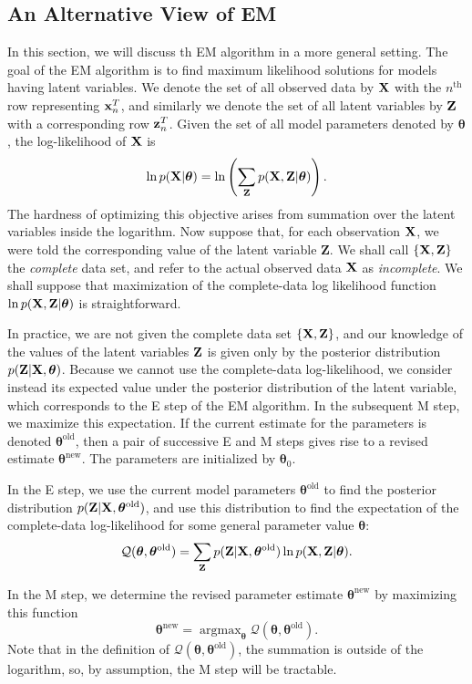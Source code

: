 \documentclass[../main.tex]{subfiles}
\begin{document}
\subsection{An Alternative View of EM}\label{sec_4_em_km_compare}
In this section, we will discuss th EM algorithm in a more general setting. The goal of the EM algorithm is to find maximum likelihood solutions for models having latent variables. We denote the set of all observed data by ${\bf X}$ with the $n^{\text{th}}$ row representing ${\bf x}_n^T$, and similarly we denote the set of all latent variables by ${\bf Z}$ with a corresponding row ${\bf z}_n^T$. Given the set of all model parameters denoted by $\bm{\theta}$, the log-likelihood of ${\bf X}$ is
\begin{equation*}
\ln p({\bf X}|\bm{\theta}) = \ln \left(\sum_{\bf Z} p({\bf X,Z}|\bm{\theta}) \right).
\end{equation*}
The hardness of optimizing this objective arises from summation over the latent variables inside the logarithm. Now suppose that, for each observation ${\bf X}$, we were told the corresponding value of the latent variable {\bf Z}. We shall call $\{{\bf X, Z}\}$ the \emph{complete} data set, and refer to the actual observed data ${\bf X}$ as \emph{incomplete}. We shall suppose that maximization of the complete-data log likelihood function $\ln p({\bf X,Z}|\bm{\theta})$ is straightforward.
\par In practice, we are not given the complete data set $\{{\bf X, Z}\}$, and our knowledge of the values of the latent variables ${\bf Z}$ is given only by the posterior distribution $p({\bf Z}|{\bf X},\bm{\theta})$. Because we cannot use the complete-data log-likelihood, we consider instead its expected value under the posterior distribution of the latent variable, which corresponds to the E step of the EM algorithm. In the subsequent M step, we maximize this expectation. If the current estimate for the parameters is denoted $\bm{\theta}^{\text{old}}$, then a pair of successive E and M steps gives rise to a revised estimate $\bm{\theta}^{\text{new}}$. The parameters are initialized by $\bm{\theta}_0$.
\par In the E step, we use the current model parameters $\bm{\theta}^{\text{old}}$ to find the posterior distribution $p({\bf Z}|{\bf X},\bm{\theta}^{\text{old}})$, and use this distribution to find the expectation of the complete-data log-likelihood for some general parameter value $\bm{\theta}$:
\begin{equation*}
\mathcal{Q}(\bm{\theta}, \bm{\theta}^{\text{old}}) = \sum_{\bf Z} p({\bf Z}|{\bf X},\bm{\theta}^{\text{old}}) \ln p({\bf X, Z}|\bm{\theta}).
\end{equation*}
\par In the M step, we determine the revised parameter estimate $\bm{\theta}^{\text{new}}$ by maximizing this function
\begin{equation*}
\bm{\theta}^{\text{new}} = \mathop{\arg\max}_{\bm{\theta}} 	\mathcal{Q}(\bm{\theta}, \bm{\theta}^{\text{old}}).
\end{equation*}
Note that in the definition of $\mathcal{Q}(\bm{\theta}, \bm{\theta}^{\text{old}})$, the summation is outside of the logarithm, so, by assumption, the M step will be tractable.
\end{document}
